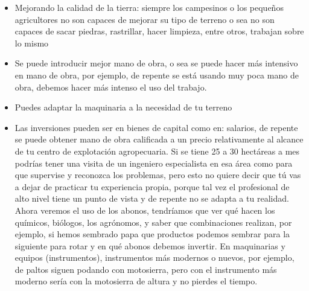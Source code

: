\documentclass[
  a4paper,
]{article}
\begin{document}
\begin{itemize}
\item
  Mejorando la calidad de la tierra: siempre los campesinos o los
  pequeños agricultores no son capaces de mejorar su tipo de terreno o
  sea no son capaces de sacar piedras, rastrillar, hacer limpieza, entre
  otros, trabajan sobre lo mismo
\item
  Se puede introducir mejor mano de obra, o sea se puede hacer más
  intensivo en mano de obra, por ejemplo, de repente se está usando muy
  poca mano de obra, debemos hacer más intenso el uso del trabajo.
\item
  Puedes adaptar la maquinaria a la necesidad de tu terreno
\item
  Las inversiones pueden ser en bienes de capital como en: salarios, de
  repente se puede obtener mano de obra calificada a un precio
  relativamente al alcance de tu centro de explotación agropecuaria. Si
  se tiene 25 a 30 hectáreas a mes podrías tener una visita de un
  ingeniero especialista en esa área como para que supervise y reconozca
  los problemas, pero esto no quiere decir que tú vas a dejar de
  practicar tu experiencia propia, porque tal vez el profesional de alto
  nivel tiene un punto de vista y de repente no se adapta a tu realidad.
  Ahora veremos el uso de los abonos, tendríamos que ver qué hacen los
  químicos, biólogos, los agrónomos, y saber que combinaciones realizan,
  por ejemplo, si hemos sembrado papa que productos podemos sembrar para
  la siguiente para rotar y en qué abonos debemos invertir. En
  maquinarias y equipos (instrumentos), instrumentos más modernos o
  nuevos, por ejemplo, de paltos siguen podando con motosierra, pero con
  el instrumento más moderno sería con la motosierra de altura y no
  pierdes el tiempo.
\end{itemize}
\end{document}
